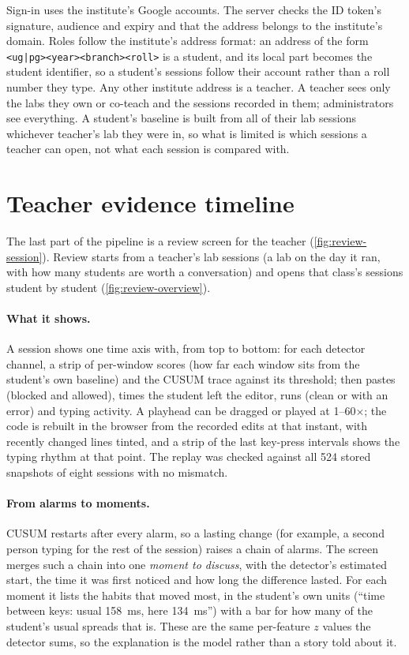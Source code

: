 Sign-in uses the institute's Google accounts. The server checks the ID token's
signature, audience and expiry and that the address belongs to the institute's
domain. Roles follow the institute's address format: an address of the form
\texttt{<ug|pg><year><branch><roll>} is a student, and its local part becomes
the student identifier, so a student's sessions follow their account rather
than a roll number they type. Any other institute address is a teacher. A
teacher sees only the labs they own or co-teach and the sessions recorded in
them; administrators see everything. A student's baseline is built from all of
their lab sessions whichever teacher's lab they were in, so what is limited is
which sessions a teacher can open, not what each session is compared with.

\section{Teacher evidence timeline}
\label{sec:review-timeline}
The last part of the pipeline is a review screen for the teacher
(\cref{fig:review-session}). Review starts from a teacher's lab sessions (a lab
on the day it ran, with how many students are worth a conversation) and opens
that class's sessions student by student (\cref{fig:review-overview}).

\paragraph{What it shows.} A session shows one time axis with, from top to
bottom: for each detector channel, a strip of per-window scores (how far each
window sits from the student's own baseline) and the CUSUM trace against its
threshold; then pastes (blocked and allowed), times the student left the
editor, runs (clean or with an error) and typing activity. A playhead can be
dragged or played at 1--60$\times$; the code is rebuilt in the browser from the
recorded edits at that instant, with recently changed lines tinted, and a strip
of the last key-press intervals shows the typing rhythm at that point. The
replay was checked against all 524 stored snapshots of eight sessions with no
mismatch.

\paragraph{From alarms to moments.} CUSUM restarts after every alarm, so a
lasting change (for example, a second person typing for the rest of the
session) raises a chain of alarms. The screen merges such a chain into one
\emph{moment to discuss}, with the detector's estimated start, the time it was
first noticed and how long the difference lasted. For each moment it lists the
habits that moved most, in the student's own units (``time between keys:
usual \SI{158}{\milli\second}, here \SI{134}{\milli\second}'') with a bar for
how many of the student's usual spreads that is. These are the same
per-feature $z$ values the detector sums, so the explanation is the model
rather than a story told about it.


